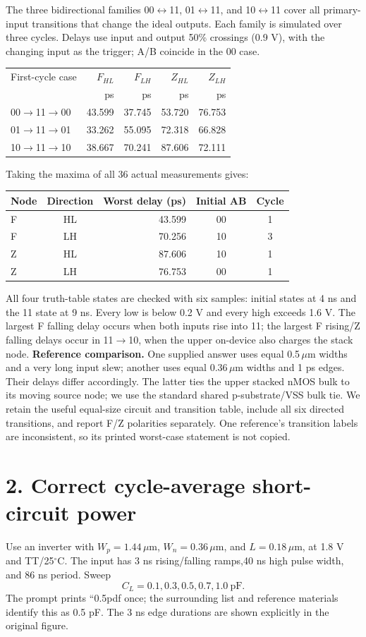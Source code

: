 \documentclass[11pt,a4paper]{article}
\begin{document}
The three bidirectional families 00$\leftrightarrow$11, 01$\leftrightarrow$11, and 10$\leftrightarrow$11 cover all primary-input transitions that change the ideal outputs. Each family is simulated over three cycles. Delays use input and output 50\% crossings (0.9 V), with the changing input as the trigger; A/B coincide in the 00 case.
\begin{center}\begin{tabular}{lrrrr}\toprule
First-cycle case&$F_{HL}$&$F_{LH}$&$Z_{HL}$&$Z_{LH}$\\
&ps&ps&ps&ps\\\midrule
00$\to$11$\to$00&43.599&37.745&53.720&76.753\\
01$\to$11$\to$01&33.262&55.095&72.318&66.828\\
10$\to$11$\to$10&38.667&70.241&87.606&72.111\\
\bottomrule\end{tabular}\end{center}
\newpage
Taking the maxima of all 36 actual measurements gives:
\begin{center}\begin{tabular}{lcrcc}\toprule
Node&Direction&Worst delay (ps)&Initial AB&Cycle\\\midrule
F&HL&43.599&00&1\\
F&LH&70.256&10&3\\
Z&HL&87.606&10&1\\
Z&LH&76.753&00&1\\
\bottomrule\end{tabular}\end{center}
All four truth-table states are checked with six samples: initial states at 4 ns and the 11 state at 9 ns. Every low is below 0.2 V and every high exceeds 1.6 V. The largest F falling delay occurs when both inputs rise into 11; the largest F rising/Z falling delays occur in 11$\to$10, when the upper on-device also charges the stack node.
\textbf{Reference comparison.} One supplied answer uses equal 0.5$\,\mu$m widths and a very long input slew; another uses equal 0.36$\,\mu$m widths and 1 ps edges. Their delays differ accordingly. The latter ties the upper stacked nMOS bulk to its moving source node; we use the standard shared p-substrate/VSS bulk tie. We retain the useful equal-size circuit and transition table, include all six directed transitions, and report F/Z polarities separately. One reference's transition labels are inconsistent, so its printed worst-case statement is not copied.

\section*{2. Correct cycle-average short-circuit power}
Use an inverter with $W_p=1.44\,\mu$m, $W_n=0.36\,\mu$m, and $L=0.18\,\mu$m, at 1.8 V and TT/25$^\circ$C. The input has 3 ns rising/falling ramps,40 ns high pulse width, and 86 ns period. Sweep
\[
 C_L=0.1,0.3,0.5,0.7,1.0\ \mathrm{pF}.
\]
The prompt prints ``0.5pdf once; the surrounding list and reference materials identify this as 0.5 pF. The 3 ns edge durations are shown explicitly in the original figure.
\end{document}
